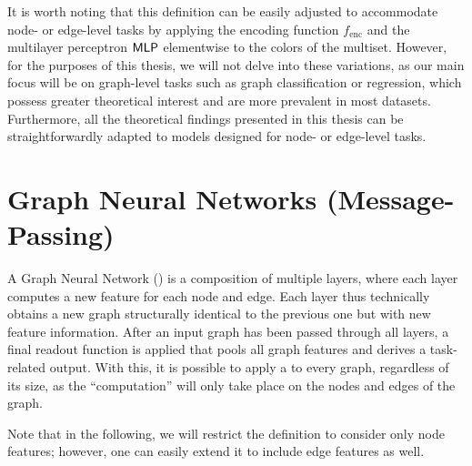 It is worth noting that this definition can be easily adjusted to accommodate node- or edge-level tasks by applying the encoding function $f_\text{enc}$ and the multilayer perceptron $\textsf{MLP}$ elementwise to the colors of the multiset. However, for the purposes of this thesis, we will not delve into these variations, as our main focus will be on graph-level tasks such as graph classification or regression, which possess greater theoretical interest and are more prevalent in most datasets. Furthermore, all the theoretical findings presented in this thesis can be straightforwardly adapted to \wlnn models designed for node- or edge-level tasks.

\section{Graph Neural Networks (Message-Passing)}\label{sec:GNN Defintion}
A \textsf{Graph Neural Network} (\gnn) is a composition of multiple layers, where each layer computes a new feature for each node and edge. Each \gnn layer thus technically obtains a new graph structurally identical to the previous one but with new feature information. After an input graph has been passed through all layers, a final readout function is applied that pools all graph features and derives a task-related output. With this, it is possible to apply a \gnn to every graph, regardless of its size, as the ``computation'' will only take place on the nodes and edges of the graph.

Note that in the following, we will restrict the definition to consider only node features; however, one can easily extend it to include edge features as well.

